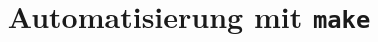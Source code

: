

\title[\texttt{make}]{Automatisierung mit \texttt{make}}



{
  \begin{frame}
    \titlepage
  \end{frame}
}




